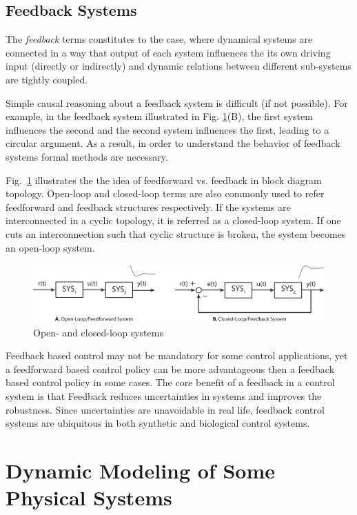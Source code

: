 \documentclass[twoside]{article}
\begin{document}
\subsection*{Feedback Systems}

The \textit{feedback} terms constitutes to the case, where 
dynamical systems are connected in a way that output of each 
system influences the its own driving input (directly or indirectly)
and dynamic relations between different sub-systems are 
tightly coupled. 

Simple causal reasoning about a feedback system is difficult (if not possible). 
For example, in the feedback system illustrated in Fig. \ref{fig:closed_open}(B), 
the first system influences the second and the second system influences the first,
leading to a circular argument. As a result, in order to understand the behavior of 
feedback systems formal methods are necessary. 

Fig.~\ref{fig:closed_open} illustrates the the idea of feedforward vs. feedback 
in block diagram topology. Open-loop and closed-loop terms are also commonly
used to refer feedforward and feedback structures respectively.  
If the systems are interconnected in a cyclic topology, it is referred as a 
closed-loop system. If one cuts an interconnection such that cyclic 
structure is broken, the system becomes an open-loop system.

\begin{figure}[h]
	\centering
	\includegraphics[width=\textwidth]{closed_openloop}
	\caption{Open- and closed-loop systems}
	\label{fig:closed_open}
\end{figure}

Feedback based control may not be mandatory for some control 
applications, yet a feedforward based control policy can be more
advantageous then a feedback based control policy in some cases. 
The core benefit of a feedback in a control system is that Feedback
reduces uncertainties in systems and improves the robustness. 
Since uncertainties are unavoidable in real life, feedback
control systems are ubiquitous in both synthetic and biological
control systems. 

\section*{Dynamic Modeling of Some Physical Systems}
\end{document}
